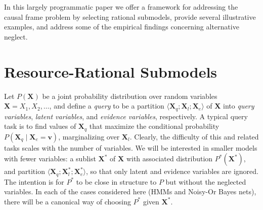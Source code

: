 \documentclass[10pt,letterpaper]{article}
\begin{document}
In this largely programmatic paper we offer a framework for addressing the causal frame problem by selecting rational submodels, provide several illustrative examples, and address some of the empirical findings concerning alternative neglect.

\section{Resource-Rational Submodels}

Let $P(\textbf{X})$ be a joint probability distribution over random variables $\textbf{X} = X_1,X_2,\dots$, and define a \emph{query} to be a partition $\langle \textbf{X}_q;\textbf{X}_l;\textbf{X}_e\rangle$ of \textbf{X} into \emph{query variables}, \emph{latent variables}, and \emph{evidence variables}, respectively. A typical query task is to find values of $\textbf{X}_q$ that maximize the conditional probability $P(\textbf{X}_q\mid \textbf{X}_e = \textbf{v})$, marginalizing over $\textbf{X}_l$. Clearly, the difficulty of this and related tasks scales with the number of variables. We will be interested in smaller models with fewer variables: a sublist $\textbf{X}^*$ of $\textbf{X}$ with associated distribution $P^*(\textbf{X}^*)$, and partition $\langle \textbf{X}_q;\textbf{X}_l^*;\textbf{X}_e^*\rangle$, so that only latent and evidence variables are ignored. 
The intention is for $P^{*}$ to be close in structure to $P$ but without the neglected variables.
In each of the cases considered here (HMMs and Noisy-Or Bayes nets), there will be a canonical way of choosing $P^*$ given $\textbf{X}^*$.
\end{document}
